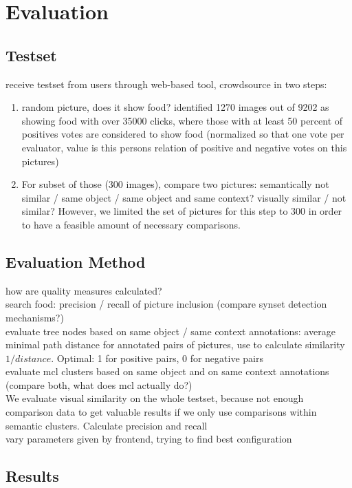 %
\section{Evaluation}
\label{sec_literatur}

\subsection{Testset}
receive testset from users through web-based tool, crowdsource in two steps: \\

\begin{enumerate}
\item random picture, does it show food? identified 1270 images out of 9202 as showing food with over 35000 clicks, where those with at least 50 percent of positives votes are considered to show food (normalized so that one vote per evaluator, value is this persons relation of positive and negative votes on this pictures) \\
\item For subset of those (300 images), compare two pictures: semantically not similar / same object / same object and same context? visually similar / not similar? However, we limited the set of pictures for this step to 300 in order to have a feasible amount of necessary comparisons.\\
\end{enumerate}

\subsection{Evaluation Method}
how are quality measures calculated? \\

search food: precision  / recall of picture inclusion (compare synset detection mechanisms?) \\
evaluate tree nodes based on same object / same context annotations: average minimal path distance for annotated pairs of pictures, use to calculate similarity $1/distance$. Optimal: 1 for positive pairs, 0 for negative pairs\\
evaluate mcl clusters based on same object and on same context annotations (compare both, what does mcl actually do?) \\

We evaluate visual similarity on the whole testset, because not enough comparison data to get valuable results if we only use comparisons within semantic clusters. Calculate precision and recall\\

vary parameters given by frontend, trying to find best configuration \\

\subsection{Results}

